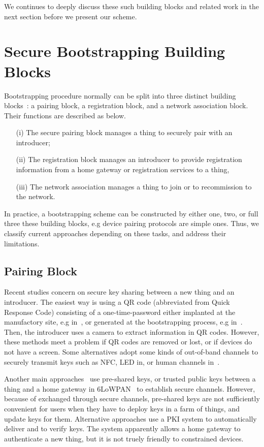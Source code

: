We continues to deeply discuss these such building blocks and related work in the next section before we present our scheme. 

\section{Secure Bootstrapping Building Blocks}\label{buildingblocks}

Bootstrapping procedure normally can be split into three distinct building blocks~\cite{secureboot}: a pairing block, a registration block, and a network association block. Their functions are described as below. 
\begin{enumerate}
\item [(i)] The secure pairing block manages a thing to securely pair with an introducer; 
\item [(ii)] The registration block manages an introducer to provide registration information from a home gateway or registration services to a thing,
\item [(iii)] The network association manages a thing to join or to recommission to the network.
\end{enumerate}

In practice, a bootstrapping scheme can be constructed by either one, two, or full three these building blocks, e.g device pairing protocols are simple ones. Thus, we classify current approaches depending on these tasks, and address their limitations. 

\subsection{Pairing Block}
Recent studies concern on secure key sharing between a new thing and an introducer. The easiest way is using a QR code (abbreviated from Quick Response Code) consisting of a one-time-password either implanted at the manufactory site, e.g in~\cite{Jeanning2013}, or generated at the bootstrapping process, e.g in~\cite{Seung2015}. Then, the introducer uses a camera to extract information in QR codes. However, these methods meet a problem if QR codes are removed or lost, or if devices do not have a screen. Some alternatives adopt some kinds of out-of-band channels to securely transmit keys such as NFC, LED in\cite{4159919}, or human channels in~\cite{5654588}.

Another main approaches~\cite{JCMjcm0708634642, Cha:2011:LSE:1968613.1968679, Ikram:2009:SLA:1582379.1582583, 6263790} use pre-shared keys, or trusted public keys between a thing and a home gateway in 6LoWPAN~\cite{6lowpan} to establish secure channels. However, because of exchanged through secure channels, pre-shared keys are not sufficiently convenient for users when they have to deploy keys in a farm of things, and update keys for them. Alternative approaches use a PKI system to automatically deliver and to verify keys. The system apparently allows a home gateway to authenticate a new thing, but it is not truely friendly to constrained devices. 

